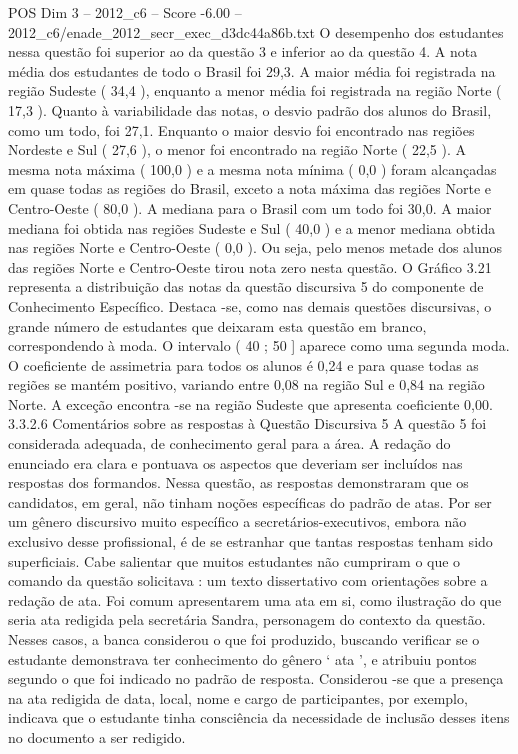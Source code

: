 \begin{textsample}{POS Dim 3 – 2012\_c6 – Score -6.00 – 2012\_c6/enade\_2012\_secr\_exec\_d3dc44a86b.txt}
O desempenho dos estudantes nessa questão foi superior ao da questão 3 e inferior ao da questão 4.
A nota média dos estudantes de todo o Brasil foi 29,3.
A maior média foi registrada na região Sudeste ( 34,4 ), enquanto a menor média foi registrada na região Norte ( 17,3 ).
Quanto à variabilidade das notas, o desvio padrão dos alunos do Brasil, como um todo, foi 27,1.
Enquanto o maior desvio foi encontrado nas regiões Nordeste e Sul ( 27,6 ), o menor foi encontrado na região Norte ( 22,5 ).
A mesma nota máxima ( 100,0 ) e a mesma nota mínima ( 0,0 ) foram alcançadas em quase todas as regiões do Brasil, exceto a nota máxima das regiões Norte e Centro-Oeste ( 80,0 ).
A mediana para o Brasil com um todo foi 30,0.
A maior mediana foi obtida nas regiões Sudeste e Sul ( 40,0 ) e a menor mediana obtida nas regiões Norte e Centro-Oeste ( 0,0 ).
Ou seja, pelo menos metade dos alunos das regiões Norte e Centro-Oeste tirou nota zero nesta questão.
O Gráfico 3.21 representa a distribuição das notas da questão discursiva 5 do componente de Conhecimento Específico.
Destaca -se, como nas demais questões discursivas, o grande número de estudantes que deixaram esta questão em branco, correspondendo à moda.
O intervalo ( 40 ; 50 ] aparece como uma segunda moda.
O coeficiente de assimetria para todos os alunos é 0,24 e para quase todas as regiões se mantém positivo, variando entre 0,08 na região Sul e 0,84 na região Norte.
A exceção encontra -se na região Sudeste que apresenta coeficiente 0,00. 3.3.2.6 Comentários sobre as respostas à Questão Discursiva 5 A questão 5 foi considerada adequada, de conhecimento geral para a área.
A redação do enunciado era clara e pontuava os aspectos que deveriam ser incluídos nas respostas dos formandos.
Nessa questão, as respostas demonstraram que os candidatos, em geral, não tinham noções específicas do padrão de atas.
Por ser um gênero discursivo muito específico a secretários-executivos, embora não exclusivo desse profissional, é de se estranhar que tantas respostas tenham sido superficiais.
Cabe salientar que muitos estudantes não cumpriram o que o comando da questão solicitava : um texto dissertativo com orientações sobre a redação de ata.
Foi comum apresentarem uma ata em si, como ilustração do que seria ata redigida pela secretária Sandra, personagem do contexto da questão.
Nesses casos, a banca considerou o que foi produzido, buscando verificar se o estudante demonstrava ter conhecimento do gênero ‘ ata ’, e atribuiu pontos segundo o que foi indicado no padrão de resposta.
Considerou -se que a presença na ata redigida de data, local, nome e cargo de participantes, por exemplo, indicava que o estudante tinha consciência da necessidade de inclusão desses itens no documento a ser redigido.

\end{textsample}
